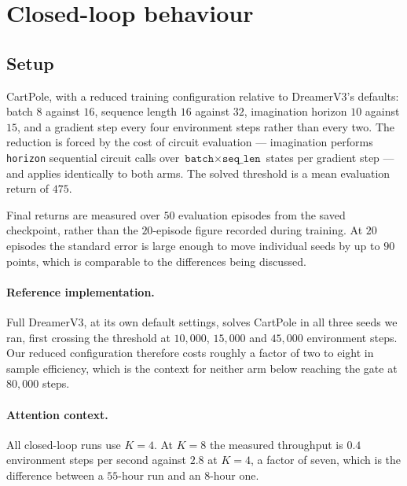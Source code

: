 \documentclass[11pt]{article}
\begin{document}
\section{Closed-loop behaviour}\label{sec:closedloop}
\subsection{Setup}
CartPole, with a reduced training configuration relative to DreamerV3's
defaults: batch $8$ against $16$, sequence length $16$ against $32$,
imagination horizon $10$ against $15$, and a gradient step every four
environment steps rather than every two. The reduction is forced by the
cost of circuit evaluation --- imagination performs \texttt{horizon}
sequential circuit calls over $\texttt{batch} \times
\texttt{seq\_len}$ states per gradient step --- and applies identically
to both arms. The solved threshold is a mean evaluation return of $475$.

Final returns are measured over $50$ evaluation episodes from the saved
checkpoint, rather than the $20$-episode figure recorded during
training. At $20$ episodes the standard error is large enough to move
individual seeds by up to $90$ points, which is comparable to the
differences being discussed.

\paragraph{Reference implementation.} Full DreamerV3, at its own default
settings, solves CartPole in all three seeds we ran, first crossing the
threshold at $10{,}000$, $15{,}000$ and $45{,}000$ environment steps.
Our reduced configuration therefore costs roughly a factor of two to
eight in sample efficiency, which is the context for neither arm below
reaching the gate at $80{,}000$ steps.

\paragraph{Attention context.} All closed-loop runs use $K = 4$. At
$K = 8$ the measured throughput is $0.4$ environment steps per second
against $2.8$ at $K = 4$, a factor of seven, which is the difference
between a $55$-hour run and an $8$-hour one.
\end{document}
